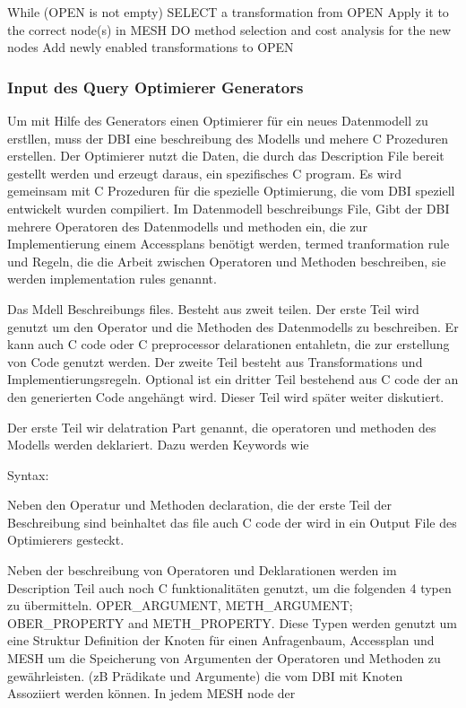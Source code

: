 While (OPEN is not empty)
	SELECT a transformation from OPEN
	Apply it to the correct node(s) in MESH
	DO method selection and cost analysis for the new nodes
	Add newly enabled transformations to OPEN

\subsubsection{Input des Query Optimierer Generators}

Um mit Hilfe des Generators einen Optimierer für ein neues Datenmodell zu erstllen, muss der DBI eine beschreibung des Modells und mehere C Prozeduren erstellen. Der Optimierer nutzt die Daten, die durch das Description File bereit gestellt werden und erzeugt daraus, ein spezifisches C program. Es wird gemeinsam mit C Prozeduren für die spezielle Optimierung, die vom DBI speziell entwickelt wurden  compiliert.
Im Datenmodell beschreibungs File, Gibt der DBI mehrere Operatoren des Datenmodells und methoden ein, die zur Implementierung einem Accessplans benötigt werden, termed tranformation rule und Regeln, die die Arbeit zwischen Operatoren und Methoden beschreiben, sie werden implementation rules genannt.

Das Mdell Beschreibungs files. Besteht aus zweit teilen. Der erste Teil wird genutzt um den Operator und die Methoden des Datenmodells zu beschreiben. Er kann auch C code oder C preprocessor delarationen entahletn, die zur erstellung von Code genutzt werden. Der zweite Teil besteht aus Transformations und Implementierungsregeln. Optional ist ein dritter Teil bestehend aus C code der an den generierten Code angehängt wird. Dieser Teil wird später weiter diskutiert.

Der erste Teil wir delatration Part genannt, die operatoren und methoden des Modells werden deklariert. Dazu werden Keywords wie %

Syntax: %


Neben den Operatur und Methoden declaration, die der erste Teil der Beschreibung sind beinhaltet das file auch C code der wird in ein Output File des Optimierers gesteckt. 


Neben der beschreibung von Operatoren und Deklarationen werden im Description Teil auch noch C funktionalitäten genutzt, um die folgenden 4 typen zu übermitteln. OPER_ARGUMENT, METH_ARGUMENT; OBER_PROPERTY and METH_PROPERTY. Diese Typen werden genutzt um eine Struktur Definition der Knoten für einen Anfragenbaum, Accessplan und MESH um die Speicherung von Argumenten der Operatoren und Methoden zu gewährleisten. (zB Prädikate und Argumente) die vom DBI mit Knoten Assoziiert werden können. In jedem MESH node der 


